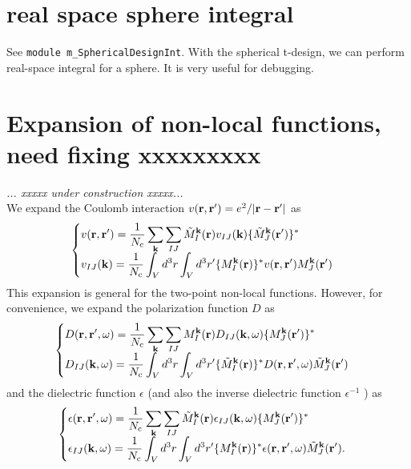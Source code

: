 \documentclass[a4paper,10pt,fleqn]{article}
\def\underconstruction{{\it... xxxxx under construction xxxxx...\\}}
\begin{document}
\section{real space sphere integral}
See \verb#module m_SphericalDesignInt#. With the spherical t-design, we can
perform real-space integral for a sphere. It is very useful for
debugging.



\section{Expansion of non-local functions, need fixing xxxxxxxxx}
\underconstruction 
We expand the Coulomb interaction $v({\bf r,r'})= e^2/|{\bf r-r'}|$ as
\begin{eqnarray}
\begin{cases}
  \displaystyle
  v({\bf r},{\bf r}')= \frac{1}{N_{\rm c}} \sum_{\bf k} \sum_{IJ}
  \tilde{M}_I^{\bf k}({\bf r})v_{IJ}({\bf k})
  \{\tilde{M}_J^{\bf k}({\bf r}')\}^*           & \cr
  \displaystyle
  v_{IJ}({\bf k}) =
  \frac{1}{N_{\rm c}} \int_V d^3 r \int_V d^3 r'
  \{M_I^{\bf k}({\bf r})\}^* 
  v({\bf r},{\bf r}') M_J^{\bf k}({\bf r}')
  \label{eq. v}
\end{cases}
\end{eqnarray}
This expansion is general for the two-point non-local functions.
However, for convenience, we expand the polarization function $D$ as
\begin{eqnarray}
\begin{cases}
  \displaystyle
  D({\bf r},{\bf r}',\omega)= \frac{1}{N_{\rm c}} \sum_{\bf k} \sum_{IJ}
  M_I^{\bf k}({\bf r})D_{IJ}({\bf k},\omega)
  \{ M_J^{\bf k}({\bf r}') \}^*           & \cr
  \displaystyle
  D_{IJ}({\bf k},\omega) =
  \frac{1}{N_{\rm c}} \int_V d^3 r \int_V d^3 r'
  \{\tilde{M}_I^{\bf k}({\bf r})\}^* 
  D({\bf r},{\bf r}',\omega) \tilde{M}_J^{\bf k}({\bf r}')
  \label{eq. D}
\end{cases}
\end{eqnarray}
and the dielectric function $\epsilon$ (and also the inverse
dielectric function $\epsilon^{-1}$ ) as
\begin{eqnarray}
\begin{cases}
  \displaystyle
  \epsilon({\bf r},{\bf r}',\omega)= 
  \frac{1}{N_{\rm c}} \sum_{\bf k} \sum_{IJ}
  \tilde{M}_I^{\bf k}({\bf r})\epsilon_{IJ}({\bf k},\omega)
  \{{M}_J^{\bf k}({\bf r}')\}^*           & \cr
  \displaystyle
  \epsilon_{IJ}({\bf k},\omega) =
  \frac{1}{N_{\rm c}} \int_V d^3 r \int_V d^3 r'
  \{M_I^{\bf k}({\bf r})\}^* 
  \epsilon({\bf r},{\bf r}',\omega) \tilde{M}_J^{\bf k}({\bf r}') .
  \label{eq. epsilon}
\end{cases}
\end{eqnarray}
\end{document}

